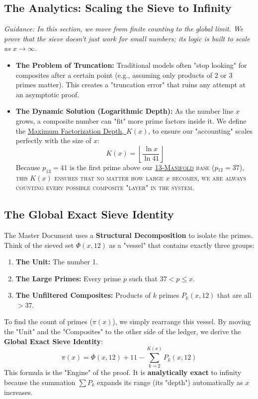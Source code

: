 \documentclass[sn-mathphys-num, pdflatex, referee]{sn-jnl}
\newcommand{\gterm}[2]{\begingroup\normalfont\scshape\hyperlink{#1}{#2}\endgroup}
\newcommand{\glink}[2]{\hyperref[gloss:#1]{#2}}
\begin{document}
\subsection{The Analytics: Scaling the Sieve to Infinity}
\textit{Guidance: In this section, we move from finite counting to the global limit. We prove that the sieve doesn't just work for small numbers; its logic is built to scale as $x \to \infty$.}

\begin{itemize}
    \item \textbf{The Problem of Truncation:} Traditional models often "stop looking" for composites after a certain point (e.g., assuming only products of 2 or 3 primes matter). This creates a "truncation error" that ruins any attempt at an asymptotic proof.
    \item \textbf{The Dynamic Solution (Logarithmic Depth):} As the number line $x$ grows, a composite number can "fit" more prime factors inside it. We define the \glink{k-limit}{Maximum Factorization Depth, $K(x)$}, to ensure our "accounting" scales perfectly with the size of $x$:
    \begin{equation}
        K(x) = \left\lfloor \frac{\ln x}{\ln 41} \right\rfloor
    \end{equation}
    Because $p_{13}=41$ is the first prime above our \gterm{m13}{13-Manifold} base ($p_{12}=37$), this $K(x)$ ensures that no matter how large $x$ becomes, we are always counting every possible composite "layer" in the system.
\end{itemize}

\subsection{The Global Exact Sieve Identity}
The Master Document uses a \textbf{Structural Decomposition} to isolate the primes. Think of the sieved set $\Phi(x,12)$ as a "vessel" that contains exactly three groups:
\begin{enumerate}
    \item \textbf{The Unit:} The number 1.
    \item \textbf{The Large Primes:} Every prime $p$ such that $37 < p \le x$.
    \item \textbf{The Unfiltered Composites:} Products of $k$ primes $P_k(x,12)$ that are all $>37$.
\end{enumerate}

To find the count of primes ($\pi(x)$), we simply rearrange this vessel. By moving the "Unit" and the "Composites" to the other side of the ledger, we derive the \textbf{Global Exact Sieve Identity}:
\begin{equation}
\label{eq:global_sieve}
\pi(x) = \Phi(x,12) + 11 - \sum_{k=2}^{K(x)} P_k(x,12)
\end{equation}
This formula is the "Engine" of the proof. It is \textbf{analytically exact} to infinity because the summation \glink{pk-engine}{$\sum P_k$} expands its range (its "depth") automatically as $x$ increases.
\end{document}
